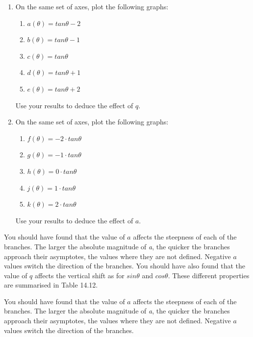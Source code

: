 \label{m39414*id90310}\begin{enumerate}[noitemsep, label=\textbf{\arabic*}. ] 
\label{m39414*uid74}\item On the same set of axes, plot the following graphs:
\label{m39414*id90326}\begin{enumerate}[noitemsep, label=\textbf{\alph*}. ] 
\label{m39414*uid75}\item $a\left(\theta \right)=tan\theta -2$\label{m39414*uid76}\item $b\left(\theta \right)=tan\theta -1$\label{m39414*uid77}\item $c\left(\theta \right)=tan\theta $\label{m39414*uid78}\item $d\left(\theta \right)=tan\theta +1$\label{m39414*uid79}\item $e\left(\theta \right)=tan\theta +2$\end{enumerate}
Use your results to deduce the effect of $q$.
\label{m39414*uid80}\item On the same set of axes, plot the following graphs:
\label{m39414*id90547}\begin{enumerate}[noitemsep, label=\textbf{\alph*}. ] 
\label{m39414*uid81}\item $f\left(\theta \right)=-2\ensuremath{\cdot}tan\theta $\label{m39414*uid82}\item $g\left(\theta \right)=-1\ensuremath{\cdot}tan\theta $\label{m39414*uid83}\item $h\left(\theta \right)=0\ensuremath{\cdot}tan\theta $\label{m39414*uid84}\item $j\left(\theta \right)=1\ensuremath{\cdot}tan\theta $\label{m39414*uid85}\item $k\left(\theta \right)=2\ensuremath{\cdot}tan\theta $\end{enumerate}
Use your results to deduce the effect of $a$.
\end{enumerate}
\label{m39414*id90781}You should have found that the value of $a$ affects the steepness of each of the branches. The larger the absolute magnitude of \textsl{a}, the quicker the branches approach their asymptotes, the values where they are not defined. Negative $\mathit{a}$ values switch the direction of the branches.
You should have also found that the value of $q$ affects the vertical shift as for $sin\theta $ and $cos\theta $.
These different properties are summarised in Table 14.12.\par 
\label{m39414*id90781}You should have found that the value of $a$ affects the steepness of each of the branches. The larger the absolute magnitude of \textsl{a}, the quicker the branches approach their asymptotes, the values where they are not defined. Negative $\mathit{a}$ values switch the direction of the branches.
